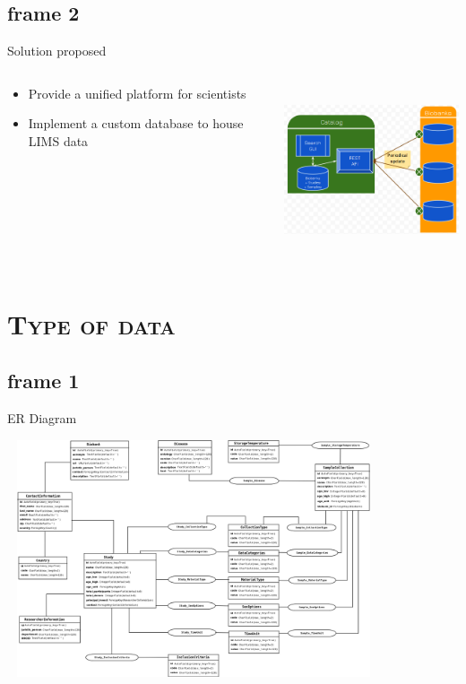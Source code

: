 \documentclass[xcolor=x11names,compress]{beamer}
\renewcommand{\(}{\begin{columns}}
\renewcommand{\)}{\end{columns}}
\newcommand{\<}[1]{\begin{column}{#1}}
\renewcommand{\>}{\end{column}}
\begin{document}
\subsection{frame 2}
\begin{frame}{Solution proposed}

\begin{columns}[T]
 \begin{column}{.5\textwidth}
  \begin{block}{}
    \begin{itemize}
     \item Provide a unified platform for scientists
     \item Implement a custom database to house LIMS data
    \end{itemize}
  \end{block}
 \end{column}
 \begin{column}{.5\textwidth}
  \begin{block}{}
   \includegraphics[width=6cm, height=5cm]{images/solution.png}
  \end{block}
 \end{column}
\end{columns}


\end{frame}

\section{\scshape Type of data}
\subsection{frame 1}
\begin{frame}{ER Diagram}
  \begin{block}{}
   \includegraphics[width=11cm, height=7cm]{images/ER_Diagram.png}
  \end{block}
\end{frame}
\end{document}
